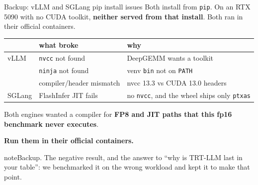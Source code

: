 \documentclass[aspectratio=169,10pt]{beamer}
\newcommand{\emphc}[1]{\textcolor{accent}{\textbf{#1}}}
\begin{document}
\begin{frame}{Backup: vLLM and SGLang pip install issues}
  \small
  Both install from \texttt{pip}. On an RTX 5090 with no CUDA toolkit,
  \emphc{neither served from that install}. Both ran in their official
  containers.
  \vspace{0.5em}
  \begin{center}
    \begin{tabular}{lll}
      \toprule
      & \textbf{what broke} & \textbf{why} \\
      \midrule
      vLLM    & \texttt{nvcc} not found        & DeepGEMM wants a toolkit \\
              & \texttt{ninja} not found       & venv \texttt{bin} not on \texttt{PATH} \\
              & compiler/header mismatch       & nvcc 13.3 vs CUDA 13.0 headers \\[0.4em]
      SGLang  & FlashInfer JIT fails           & no \texttt{nvcc}, and the wheel ships only \texttt{ptxas} \\[0.4em]
      \bottomrule
    \end{tabular}
  \end{center}
  \vspace{0.6em}
  Both engines wanted a compiler for \textbf{FP8 and JIT paths that this fp16
  benchmark never executes}.
  \vspace{0.3em}
  \begin{center}
    \emphc{Run them in their official containers.}
  \end{center}
\end{frame}

note{Backup. The negative result, and the answer to ``why is TRT-LLM last in
your table'': we benchmarked it on the wrong workload and kept it to make
that point.}
\end{document}
